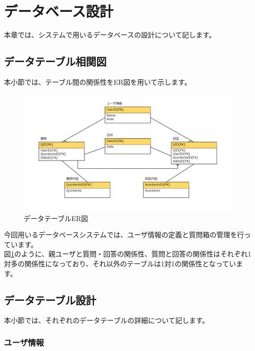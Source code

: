 \documentclass[a4j]{jarticle}
\begin{document}
\newpage

\section{データベース設計}
本章では、システムで用いるデータベースの設計について記します。
\subsection{データテーブル相関図}
本小節では、テーブル間の関係性をER図を用いて示します。
\begin{figure}[H]
  \begin{center} %
    \includegraphics[width=16.0cm]{ER図.png}
    \caption{データテーブルER図} %
    \label{fig:er} %
  \end{center}
\end{figure}

今回用いるデータベースシステムでは、ユーザ情報の定義と質問箱の管理を行っています。\\
図\ref{fig:er}のように、親ユーザと質問・回答の関係性、質問と回答の関係性はそれぞれ1対多の関係性になっており、それ以外のテーブルは1対1の関係性となっています。

\subsection{データテーブル設計}
本小節では、それぞれのデータテーブルの詳細について記します。

\subsubsection{ユーザ情報}
\end{document}

